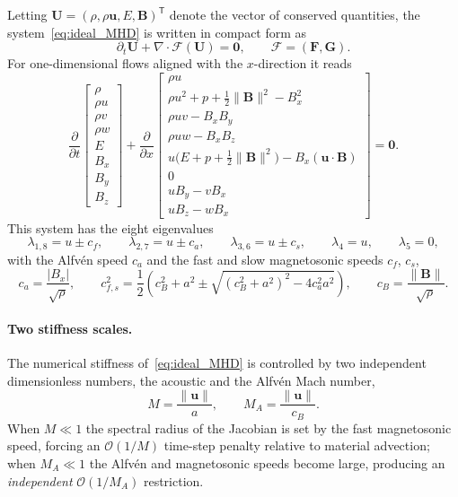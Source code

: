 \documentclass[a4paper,fleqn]{cas-sc}
\theoremstyle{remark}
\newcommand{\Bb}{\mathbf{B}}
\newcommand{\FF}{\mathbf{F}}
\newcommand{\GG}{\mathbf{G}}
\newcommand{\half}{\tfrac{1}{2}}
\begin{document}
Letting $\mathbf{U}=(\rho,\rho\mathbf{u},E,\Bb)^{\mathsf T}$ denote the vector of conserved
quantities, the system~\eqref{eq:ideal_MHD} is written in compact form as
\begin{equation}
\label{eq:compact_MHD}
\partial_t\mathbf{U}+\nabla\cdot\boldsymbol{\mathcal F}(\mathbf{U})=\mathbf0,
\qquad \boldsymbol{\mathcal F}=(\FF,\GG).
\end{equation}
For one-dimensional flows aligned with the $x$-direction it reads
\begin{equation}
\label{eq:1DMHD}
\frac{\partial}{\partial t}
\begin{bmatrix}
\rho \\ \rho u \\ \rho v \\ \rho w \\ E \\ B_x \\ B_y \\ B_z
\end{bmatrix}
+
\frac{\partial}{\partial x}
\begin{bmatrix}
\rho u \\
\rho u^2+p+\half\|\Bb\|^2-B_x^2 \\
\rho uv-B_xB_y \\
\rho uw-B_xB_z \\
u\big(E+p+\half\|\Bb\|^2\big)-B_x(\mathbf{u}\cdot\Bb) \\
0 \\
uB_y-vB_x \\
uB_z-wB_x
\end{bmatrix}
=\mathbf 0 .
\end{equation}
This system has the eight eigenvalues
\begin{equation}
\label{eq:MHD_eigs}
\lambda_{1,8} = u \pm c_f, \qquad
\lambda_{2,7} = u \pm c_a, \qquad
\lambda_{3,6} = u \pm c_s, \qquad
\lambda_4 = u, \qquad
\lambda_5 = 0 ,
\end{equation}
with the Alfv\'en speed $c_a$ and the fast and slow magnetosonic speeds
$c_f$, $c_s$,
\begin{equation}
\label{eq:MHD_speeds}
c_a = \frac{|B_x|}{\sqrt{\rho}},\qquad
c_{f,s}^2 =\frac{1}{2}\left(c_B^2 + a^2\pm
\sqrt{\left(c_B^2 + a^2\right)^2-4 c_a^2 a^2}\right),
\qquad c_B=\frac{\|\Bb\|}{\sqrt{\rho}} .
\end{equation}

\paragraph{Two stiffness scales.}
The numerical stiffness of~\eqref{eq:ideal_MHD} is controlled by two
independent dimensionless numbers, the acoustic and the Alfv\'en Mach number,
\begin{equation}
\label{eq:two_mach}
M=\frac{\|\mathbf{u}\|}{a},\qquad
M_A=\frac{\|\mathbf{u}\|}{c_B} .
\end{equation}
When $M\ll1$ the spectral radius of the Jacobian is set by the fast magnetosonic
speed, forcing an $\mathcal O(1/M)$ time-step penalty relative to
material advection; when $M_A\ll1$ the Alfv\'en and magnetosonic speeds become
large, producing an \emph{independent} $\mathcal O(1/M_A)$ restriction.
 
\end{document}
